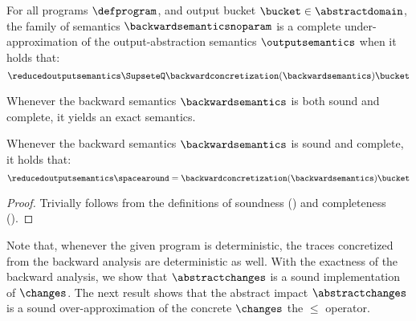 \begin{definition}
  For all programs $\defprogram$, and output bucket $\bucket\in\abstractdomain$, the family of semantics $\backwardsemanticsnoparam$ is a \textup{complete under-approximation} of the output-abstraction semantics $\outputsemantics$
  when it holds that:
  \[\reducedoutputsemantics \SupseteQ \backwardconcretization(\backwardsemantics)\bucket\]
\end{definition}

Whenever the backward semantics $\backwardsemantics$ is both sound and complete, it yields an exact semantics.

\begin{lemma}
  Whenever the backward semantics $\backwardsemantics$ is sound and complete, it holds that:
  \[\reducedoutputsemantics \spacearound= \backwardconcretization(\backwardsemantics)\bucket\]
\end{lemma}
\begin{proof}
  Trivially follows from the definitions of soundness () and completeness ().
\end{proof}

Note that, whenever the given program is deterministic, the traces concretized from the backward analysis are deterministic as well.
With the exactness of the backward analysis, we show that $\abstractchanges$ is a sound implementation of $\changes$.
The next result shows that the abstract impact $\abstractchanges$ is a sound over-approximation of the concrete $\changes$ \wrt{} the $\le$ operator.


